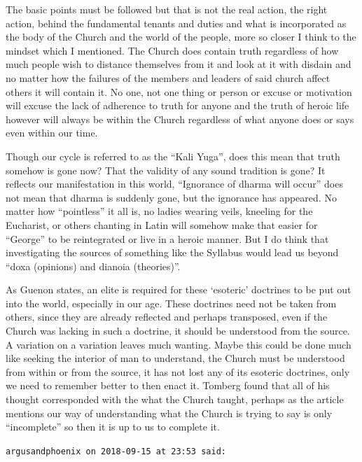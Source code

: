 \begin{footnotesize}
\begin{sffamily}
The basic points must be followed but that is not the real action, the right action, behind the fundamental tenants and
duties and what is incorporated as the body of the Church and the world of the people, more so closer I think to the
mindset which I mentioned. The Church does contain truth regardless of how much people wish to distance themselves from
it and look at it with disdain and no matter how the failures of the members and leaders of said church affect others
it will contain it. No one, not one thing or person or excuse or motivation will excuse the lack of adherence to truth
for anyone and the truth of heroic life however will always be within the Church regardless of what anyone does or says
even within our time.

Though our cycle is referred to as the “Kali Yuga”, does this mean that truth somehow is gone now? That the validity of
any sound tradition is gone? It reflects our manifestation in this world, “Ignorance of dharma will occur” does not
mean that dharma is suddenly gone, but the ignorance has appeared. No matter how “pointless” it all is, no ladies
wearing veils, kneeling for the Eucharist, or others chanting in Latin will somehow make that easier for “George” to be
reintegrated or live in a heroic manner. But I do think that investigating the sources of something like the Syllabus
would lead us beyond “doxa (opinions) and dianoia (theories)”.

As Guenon states, an elite is required for these `esoteric' doctrines to be put out into the
world, especially in our age. These doctrines need not be taken from others, since they are already reflected and
perhaps transposed, even if the Church was lacking in such a doctrine, it should be understood from the source. A
variation on a variation leaves much wanting. Maybe this could be done much like seeking the interior of man to
understand, the Church must be understood from within or from the source, it has not lost any of its esoteric
doctrines, only we need to remember better to then enact it. Tomberg found that all of his thought corresponded with
the what the Church taught, perhaps as the article mentions our way of understanding what the Church is trying to say
is only “incomplete” so then it is up to us to complete it.


\hfill

\texttt{argusandphoenix on 2018-09-15 at 23:53 said: }


\end{sffamily}
\end{footnotesize}
